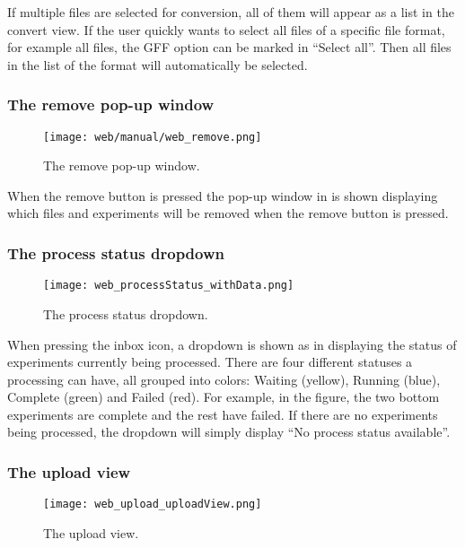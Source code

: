If multiple files are selected for conversion, all of them will appear as a list in the convert view. If the user quickly wants to select all files of a specific file format, for example all  files, the GFF option can be marked in “Select all”. Then all files in the list of the format  will automatically be selected.

\subsubsection{The remove pop-up window}
\begin{figure}[h]
\centering
\texttt{[image: web/manual/web\_remove.png]}
\caption{\label{fig:web_remove_removeFiles}The remove pop-up window.}
\end{figure}
\FloatBarrier
When the remove button is pressed the pop-up window in  is shown displaying which files and experiments will be removed when the remove button is pressed.


\subsubsection{The process status dropdown}
\begin{figure}[h]
\centering
\texttt{[image: web\_processStatus\_withData.png]}
\caption{\label{fig:web_processStatus_withData}The process status dropdown.}
\end{figure}
\FloatBarrier
When pressing the inbox icon, a dropdown is shown as in  displaying the status of experiments currently being processed. There are four different statuses a processing can have, all grouped into colors: Waiting (yellow), Running (blue), Complete (green) and Failed (red). For example, in the figure, the two bottom experiments are complete and the rest have failed. If there are no experiments being processed, the dropdown will simply display “No process status available”.


\subsubsection{The upload view}

\begin{figure}[h]
\centering
\texttt{[image: web\_upload\_uploadView.png]}
\caption{\label{fig:web_upload_uploadView}The upload view.}
\end{figure}

